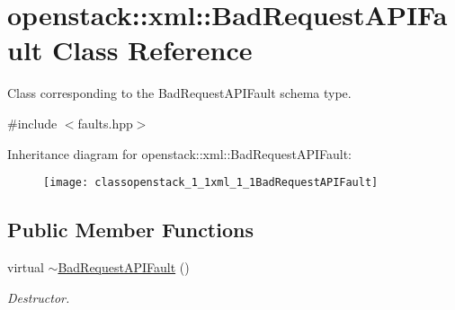 \hypertarget{classopenstack_1_1xml_1_1BadRequestAPIFault}{
\section{openstack::xml::BadRequestAPIFault Class Reference}
\label{classopenstack_1_1xml_1_1BadRequestAPIFault}
}


Class corresponding to the BadRequestAPIFault schema type.  




{\ttfamily \#include $<$faults.hpp$>$}

Inheritance diagram for openstack::xml::BadRequestAPIFault:\begin{figure}[H]
\begin{center}
\leavevmode
\texttt{[image: classopenstack\_1\_1xml\_1\_1BadRequestAPIFault]}
\end{center}
\end{figure}
\subsection*{Public Member Functions}
\begin{DoxyCompactItemize}
\item 
\hypertarget{classopenstack_1_1xml_1_1BadRequestAPIFault_ac91a018b6c31562078f3456bdbbe155b}{
virtual \hyperlink{classopenstack_1_1xml_1_1BadRequestAPIFault_ac91a018b6c31562078f3456bdbbe155b}{$\sim$BadRequestAPIFault} ()}
\label{classopenstack_1_1xml_1_1BadRequestAPIFault_ac91a018b6c31562078f3456bdbbe155b}

\begin{DoxyCompactList}\small\item\em Destructor. \item\end{DoxyCompactList}\end{DoxyCompactItemize}
